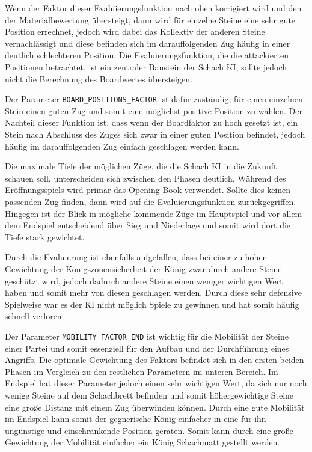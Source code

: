 Wenn der Faktor dieser Evaluierungsfunktion nach oben korrigiert wird und den der Materialbewertung übersteigt, dann wird für einzelne Steine eine sehr gute Position errechnet, jedoch wird dabei das Kollektiv der anderen Steine vernachlässigt und diese befinden sich im darauffolgenden Zug häufig in einer deutlich schlechteren Position. Die Evaluierungsfunktion, die die attackierten Positionen betrachtet, ist ein zentraler Baustein der Schach KI, sollte jedoch nicht die Berechnung des Boardwertes übersteigen.

Der Parameter \texttt{BOARD\_POSITIONS\_FACTOR} ist dafür zuständig, für einen einzelnen Stein einen guten Zug und somit eine möglichst positive Position zu wählen. Der Nachteil dieser Funktion ist, dass wenn der Boardfaktor zu hoch gesetzt ist, ein Stein nach Abschluss des Zuges sich zwar in einer guten Position befindet, jedoch häufig im darauffolgenden Zug einfach geschlagen werden kann.

Die maximale Tiefe der möglichen Züge, die die Schach KI in die Zukunft schauen soll, unterscheiden sich zwischen den Phasen deutlich. Während des Eröffnungsspiels wird primär das Opening-Book verwendet. Sollte dies keinen passenden Zug finden, dann wird auf die Evaluierungsfunktion zurückgegriffen. Hingegen ist der Blick in mögliche kommende Züge im Hauptspiel und vor allem dem Endspiel entscheidend über Sieg und Niederlage und somit wird dort die Tiefe stark gewichtet.

Durch die Evaluierung ist ebenfalls aufgefallen, dass bei einer zu hohen Gewichtung der Königszonensicherheit der König zwar durch andere Steine geschützt wird, jedoch dadurch andere Steine einen weniger wichtigen Wert haben und somit mehr von diesen geschlagen werden. Durch diese sehr defensive Spielweise war es der KI nicht möglich Spiele zu gewinnen und hat somit häufig schnell verloren.

Der Parameter \texttt{MOBILITY\_FACTOR\_END} ist wichtig für die Mobilität der Steine einer Partei und somit essenziell für den Aufbau und der Durchführung eines Angriffs. Die optimale Gewichtung des Faktors befindet sich in den ersten beiden Phasen im Vergleich zu den restlichen Parametern im unteren Bereich. Im Endspiel hat dieser Parameter jedoch einen sehr wichtigen Wert, da sich nur noch wenige Steine auf dem Schachbrett befinden und somit höhergewichtige Steine eine große Distanz mit einem Zug überwinden können. Durch eine gute Mobilität im Endspiel kann somit der gegnerische König einfacher in eine für ihn ungünstige und einschränkende Position geraten. Somit kann durch eine große Gewichtung der Mobilität einfacher ein König Schachmatt gestellt werden.

